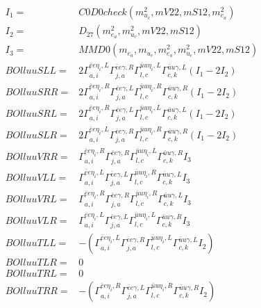 \documentclass[A4,landscape]{article}
\begin{document}
\begin{align} 
I_1 = & C0D0check(m^2_{u_{{c}}}, mV22, mS12, m^2_{e_{{a}}}) \\ 
I_2 = & D_{27}(m^2_{e_{{a}}}, m^2_{u_{{c}}}, mV22, mS12) \\ 
I_3 = & MMD0(m_{e_{{a}}}, m_{u_{{c}}}, m^2_{e_{{a}}}, m^2_{u_{{c}}}, mV22, mS12) \\ 
  BOlluuSLL= & 2  \Gamma^{\bar{e}e \eta_i ,L}_{a, i} \Gamma^{\bar{e}e \gamma ,R}_{j, a} \Gamma^{\bar{u}u \eta_i ,L}_{l, c} \Gamma^{\bar{u}u \gamma ,L}_{c, k} (I_1 - 2 I_2) \\ 
  BOlluuSRR= & 2  \Gamma^{\bar{e}e \eta_i ,R}_{a, i} \Gamma^{\bar{e}e \gamma ,L}_{j, a} \Gamma^{\bar{u}u \eta_i ,R}_{l, c} \Gamma^{\bar{u}u \gamma ,R}_{c, k} (I_1 - 2 I_2) \\ 
  BOlluuSRL= & 2  \Gamma^{\bar{e}e \eta_i ,R}_{a, i} \Gamma^{\bar{e}e \gamma ,L}_{j, a} \Gamma^{\bar{u}u \eta_i ,L}_{l, c} \Gamma^{\bar{u}u \gamma ,L}_{c, k} (I_1 - 2 I_2) \\ 
  BOlluuSLR= & 2  \Gamma^{\bar{e}e \eta_i ,L}_{a, i} \Gamma^{\bar{e}e \gamma ,R}_{j, a} \Gamma^{\bar{u}u \eta_i ,R}_{l, c} \Gamma^{\bar{u}u \gamma ,R}_{c, k} (I_1 - 2 I_2) \\ 
  BOlluuVRR= &  \Gamma^{\bar{e}e \eta_i ,R}_{a, i} \Gamma^{\bar{e}e \gamma ,R}_{j, a} \Gamma^{\bar{u}u \eta_i ,L}_{l, c} \Gamma^{\bar{u}u \gamma ,R}_{c, k} I_3 \\ 
  BOlluuVLL= &  \Gamma^{\bar{e}e \eta_i ,L}_{a, i} \Gamma^{\bar{e}e \gamma ,L}_{j, a} \Gamma^{\bar{u}u \eta_i ,R}_{l, c} \Gamma^{\bar{u}u \gamma ,L}_{c, k} I_3 \\ 
  BOlluuVRL= &  \Gamma^{\bar{e}e \eta_i ,R}_{a, i} \Gamma^{\bar{e}e \gamma ,R}_{j, a} \Gamma^{\bar{u}u \eta_i ,R}_{l, c} \Gamma^{\bar{u}u \gamma ,L}_{c, k} I_3 \\ 
  BOlluuVLR= &  \Gamma^{\bar{e}e \eta_i ,L}_{a, i} \Gamma^{\bar{e}e \gamma ,L}_{j, a} \Gamma^{\bar{u}u \eta_i ,L}_{l, c} \Gamma^{\bar{u}u \gamma ,R}_{c, k} I_3 \\ 
  BOlluuTLL= & -( \Gamma^{\bar{e}e \eta_i ,L}_{a, i} \Gamma^{\bar{e}e \gamma ,R}_{j, a} \Gamma^{\bar{u}u \eta_i ,L}_{l, c} \Gamma^{\bar{u}u \gamma ,L}_{c, k} I_2) \\ 
  BOlluuTLR= & 0 \\ 
  BOlluuTRL= & 0 \\ 
  BOlluuTRR= & -( \Gamma^{\bar{e}e \eta_i ,R}_{a, i} \Gamma^{\bar{e}e \gamma ,L}_{j, a} \Gamma^{\bar{u}u \eta_i ,R}_{l, c} \Gamma^{\bar{u}u \gamma ,R}_{c, k} I_2) \\ 
\end{align} 
\end{document}
